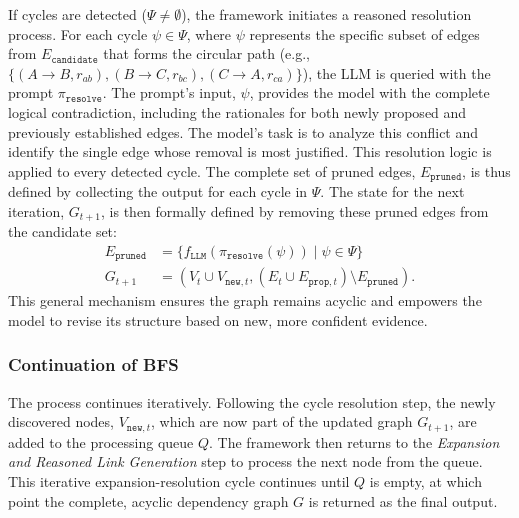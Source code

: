 If cycles are detected ($\Psi \neq \emptyset$), the framework initiates a reasoned resolution process. For each cycle $\psi \in \Psi$, where $\psi$ represents the specific subset of edges from $E_{\mathtt{candidate}}$ that forms the circular path (e.g., $\{ (A \to B, r_{ab}), (B \to C, r_{bc}), (C \to A, r_{ca}) \}$), the LLM is queried with the prompt $\pi_{\mathtt{resolve}}$. The prompt's input, $\psi$, provides the model with the complete logical contradiction, including the rationales for both newly proposed and previously established edges. The model's task is to analyze this conflict and identify the single edge whose removal is most justified. This resolution logic is applied to every detected cycle. The complete set of pruned edges, $E_{\mathtt{pruned}}$, is thus defined by collecting the output for each cycle in $\Psi$. The state for the next iteration, $G_{t+1}$, is then formally defined by removing these pruned edges from the candidate set:
\begin{equation}
    \begin{aligned}
        E_{\mathtt{pruned}} &= \{ f_{\mathtt{LLM}}(\pi_{\mathtt{resolve}}(\psi)) \mid \psi \in \Psi \} \\
        G_{t+1} &= (V_t \cup V_{\mathtt{new}, t}, (E_t \cup E_{\mathtt{prop}, t}) \setminus E_{\mathtt{pruned}}).
    \end{aligned}
\end{equation}
This general mechanism ensures the graph remains acyclic and empowers the model to revise its structure based on new, more confident evidence.


\subsubsection{Continuation of BFS}

The process continues iteratively. Following the cycle resolution step, the newly discovered nodes, $V_{\mathtt{new}, t}$, which are now part of the updated graph $G_{t+1}$, are added to the processing queue $Q$. The framework then returns to the \textit{Expansion and Reasoned Link Generation} step to process the next node from the queue. This iterative expansion-resolution cycle continues until $Q$ is empty, at which point the complete, acyclic dependency graph $G$ is returned as the final output.

